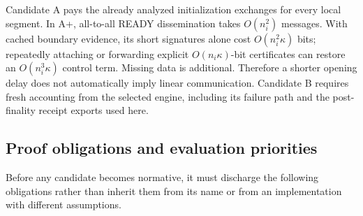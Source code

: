 Candidate A pays the already analyzed initialization exchanges for every
local segment. In A+, all-to-all READY dissemination takes $O(n_i^2)$
messages. With cached boundary evidence, its short signatures alone cost
$O(n_i^2\kappa)$ bits; repeatedly attaching or forwarding explicit
$O(n_i\kappa)$-bit certificates can restore an $O(n_i^3\kappa)$ control
term. Missing data is additional. Therefore a shorter opening delay does
not automatically imply linear communication. Candidate B requires fresh
accounting from the selected engine, including its failure path and the
post-finality receipt exports used here.

\subsection{Proof obligations and evaluation priorities}
\label{sec:rotation-obligations}
Before any candidate becomes normative, it must discharge the following
obligations rather than inherit them from its name or from an implementation
with different assumptions.
